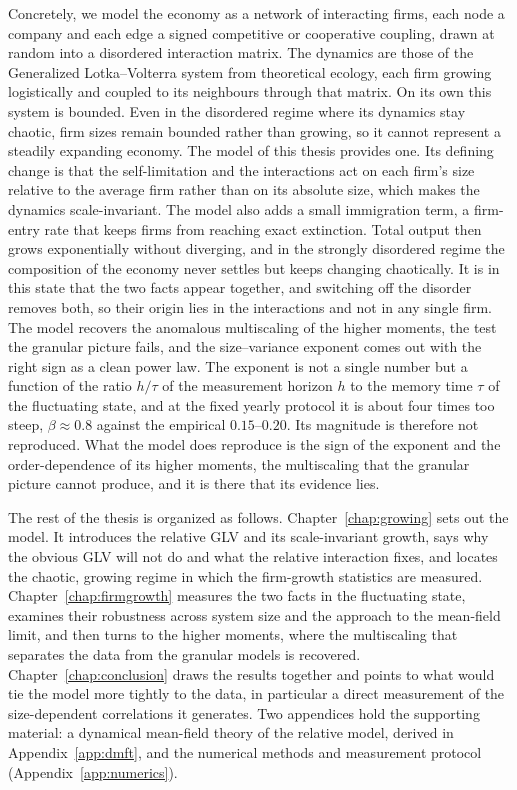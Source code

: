 Concretely, we model the economy as a network of interacting firms, each node a company and
each edge a signed competitive or cooperative coupling, drawn at random into a disordered
interaction matrix. The dynamics are those of the Generalized Lotka--Volterra system from
theoretical ecology, each firm growing logistically and coupled to its neighbours through that
matrix. On its own this system is bounded. Even in the disordered regime where its dynamics stay
chaotic, firm sizes remain bounded rather than growing, so it cannot represent a steadily
expanding economy. The model of this thesis provides one. Its defining change is that the self-limitation and the
interactions act on each firm's size relative to the average firm rather than on its absolute
size, which makes the dynamics scale-invariant. The model also adds a small immigration term, a
firm-entry rate that keeps firms from reaching exact extinction.
Total output then grows exponentially without diverging, and in the strongly disordered regime
the composition of the economy never settles but keeps changing chaotically. It is in this
state that the two facts appear together, and switching off the disorder removes both, so their
origin lies in the interactions and not in any single firm. The model recovers the
anomalous multiscaling of the higher moments, the test the granular picture fails, and the
size--variance exponent comes out with the right sign as a clean power law. The exponent is not
a single number but a function of the ratio $h/\tau$ of the measurement horizon $h$ to the
memory time $\tau$ of the fluctuating state, and at the fixed yearly protocol it is about four
times too steep, $\beta \approx 0.8$ against the empirical $0.15$--$0.20$. Its magnitude is
therefore not reproduced. What the model does reproduce is the sign of the exponent and the
order-dependence of its higher moments, the multiscaling that the granular picture cannot
produce, and it is there that its evidence lies.

The rest of the thesis is organized as follows. Chapter~\ref{chap:growing} sets out the model.
It introduces the relative GLV and its scale-invariant growth, says why the obvious GLV will
not do and what the relative interaction fixes, and locates the chaotic, growing regime in
which the firm-growth statistics are measured. Chapter~\ref{chap:firmgrowth} measures the two
facts in the fluctuating state, examines their robustness across system size and the approach
to the mean-field limit, and then turns to the higher moments, where the multiscaling that
separates the data from the granular models is recovered. Chapter~\ref{chap:conclusion} draws
the results together and points to what would tie the model more tightly to the data, in
particular a direct measurement of the size-dependent correlations it generates. Two
appendices hold the supporting material: a dynamical mean-field theory of the relative model,
derived in Appendix~\ref{app:dmft}, and the numerical methods
and measurement protocol (Appendix~\ref{app:numerics}).
